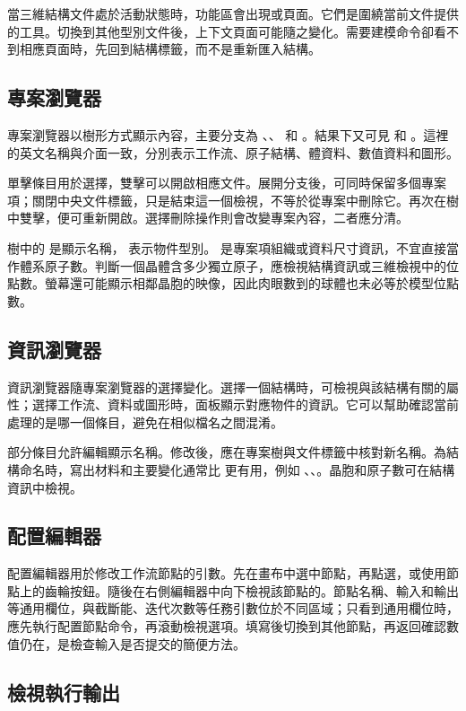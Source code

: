 當三維結構文件處於活動狀態時，功能區會出現或頁面。它們是圍繞當前文件提供的工具。切換到其他型別文件後，上下文頁面可能隨之變化。需要建模命令卻看不到相應頁面時，先回到結構標籤，而不是重新匯入結構。

\subsection{專案瀏覽器}
專案瀏覽器以樹形方式顯示內容，主要分支為 、、 和 。結果下又可見  和 。這裡的英文名稱與介面一致，分別表示工作流、原子結構、體資料、數值資料和圖形。

單擊條目用於選擇，雙擊可以開啟相應文件。展開分支後，可同時保留多個專案項；關閉中央文件標籤，只是結束這一個檢視，不等於從專案中刪除它。再次在樹中雙擊，便可重新開啟。選擇刪除操作則會改變專案內容，二者應分清。

樹中的  是顯示名稱， 表示物件型別。 是專案項組織或資料尺寸資訊，不宜直接當作體系原子數。判斷一個晶體含多少獨立原子，應檢視結構資訊或三維檢視中的位點數。螢幕還可能顯示相鄰晶胞的映像，因此肉眼數到的球體也未必等於模型位點數。

\subsection{資訊瀏覽器}
資訊瀏覽器隨專案瀏覽器的選擇變化。選擇一個結構時，可檢視與該結構有關的屬性；選擇工作流、資料或圖形時，面板顯示對應物件的資訊。它可以幫助確認當前處理的是哪一個條目，避免在相似檔名之間混淆。

部分條目允許編輯顯示名稱。修改後，應在專案樹與文件標籤中核對新名稱。為結構命名時，寫出材料和主要變化通常比  更有用，例如 、、。晶胞和原子數可在結構資訊中檢視。

\subsection{配置編輯器}
配置編輯器用於修改工作流節點的引數。先在畫布中選中節點，再點選，或使用節點上的齒輪按鈕。隨後在右側編輯器中向下檢視該節點的。節點名稱、輸入和輸出等通用欄位，與截斷能、迭代次數等任務引數位於不同區域；只看到通用欄位時，應先執行配置節點命令，再滾動檢視選項。填寫後切換到其他節點，再返回確認數值仍在，是檢查輸入是否提交的簡便方法。

\subsection{檢視執行輸出}

